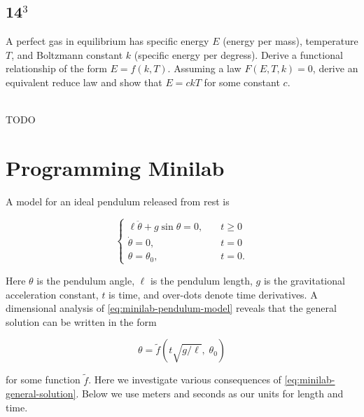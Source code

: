 \documentclass[12pt]{article}
\begin{document}
\subsection{14$^3$}
\begin{Ex}
  A perfect gas in equilibrium has specific energy $E$ (energy per mass),
  temperature $T$, and Boltzmann constant $k$ (specific energy per degress).
  Derive a functional relationship of the form $E=f(k,T)$. Assuming a law
  $F(E,T,k)=0$, derive an equivalent reduce law and show that $E=ckT$ for some
  constant $c$.
  \begin{solution} \hfill \vspace{.75em} \\
    {\huge \color{red}TODO}
  \end{solution}
\end{Ex}

\section{Programming Minilab}
A model for an ideal pendulum released from rest is

\begin{equation}
  \label{eq:minilab-pendulum-model}
   \left\{
  \begin{aligned}
    \ell\ddot{\theta}+g\sin\theta = 0, \quad & t\ge0 \\
    \dot{\theta} = 0, \quad & t = 0 \\
    \theta = \theta_0, \quad & t = 0.
  \end{aligned}\right.
\end{equation}

Here $\theta$ is the pendulum angle, $\ell$ is the pendulum length, $g$ is the
gravitational acceleration constant, $t$ is time, and over-dots denote time
derivatives. A dimensional analysis of \cref{eq:minilab-pendulum-model} reveals
that the general solution can be written in the form

\begin{equation}
  \label{eq:minilab-general-solution}
  \theta = \tilde{f}(t\sqrt{g/\ell}, \;\theta_0)
\end{equation}

for some function $\tilde{f}$. Here we investigate various consequences of
\cref{eq:minilab-general-solution}. Below we use meters and seconds as our units
for length and time.
\end{document}

